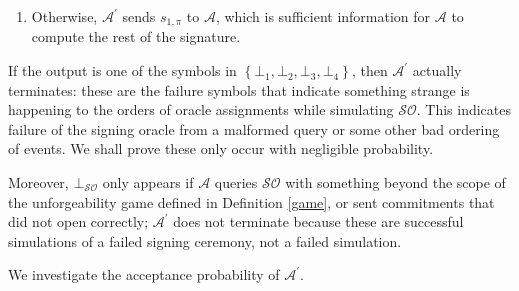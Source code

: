 \documentclass{mrl}
\theoremstyle{definition}
\numberwithin{theorem}{subsection}
\newcommand{\adversary}{\mathcal{A}}
\begin{document}
\begin{description}
\begin{description}
\begin{enumerate}
\item Otherwise, $\adversary^\prime$ sends $s_{1, \pi}$ to $\adversary$, which is sufficient information for $\adversary$ to compute the rest of the signature.

\end{enumerate}

\end{description}




\end{description}


If the output is one of the symbols in $\left\{\bot_1, \bot_2, \bot_3, \bot_4\right\}$, then $\adversary^\prime$ actually terminates: these are the failure symbols that indicate something strange is happening to the orders of oracle assignments while simulating $\mathcal{SO}$. This indicates failure of the signing oracle from a malformed query or some other bad ordering of events. We shall prove these only occur with negligible probability.

Moreover, $\bot_{\mathcal{SO}}$ only appears if $\adversary$ queries $\mathcal{SO}$ with something beyond the scope of the unforgeability game defined in Definition \ref{game}, or sent commitments that did not open correctly; $\adversary^\prime$ does not terminate because these are successful simulations of a failed signing ceremony, not a failed simulation. 

We investigate the acceptance probability of $\adversary^\prime$.
\end{document}
